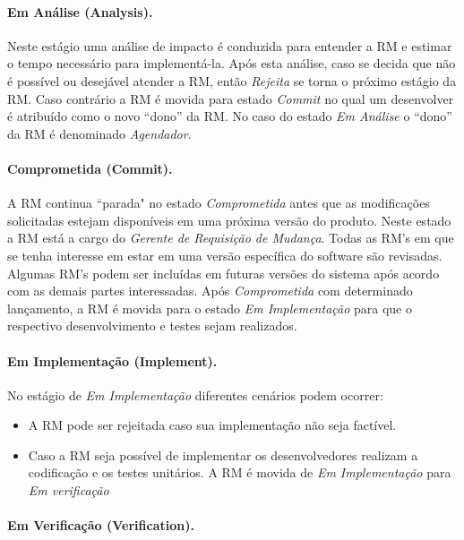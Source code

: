 \paragraph{Em Análise (Analysis).}
\label{par:em_analise}
Neste estágio uma análise de impacto é conduzida para entender a RM e estimar o
tempo necessário para implementá-la. Após esta análise, caso se decida que não é
possível ou desejável atender a RM, então \textit{Rejeita} se torna o próximo
estágio da RM. Caso contrário a RM é movida para estado \textit{Commit} no qual
um desenvolver é atribuído como o  novo ``dono'' da RM. No caso do estado
\textit{Em Análise} o ``dono'' da RM é denominado \textit{Agendador}.

\paragraph{Comprometida (Commit).}
\label{par:commit}

A RM continua ``parada" no estado \textit{Comprometida} antes que as
modificações solicitadas estejam disponíveis em uma próxima versão do produto.
Neste estado a RM está a cargo do \textit{Gerente de Requisição de Mudança}.
Todas as RM's em que se tenha interesse em estar em uma versão específica do
software são revisadas. Algumas RM's podem ser incluídas em futuras versões do
sistema após acordo com as demais partes interessadas. Após
\textit{Comprometida} com determinado lançamento, a RM é movida para o estado
\textit{Em Implementação} para que o respectivo desenvolvimento e testes sejam
realizados.

\paragraph{Em Implementação (Implement).}
\label{par:em_implementacao}

No estágio de \textit{Em Implementação} diferentes cenários podem ocorrer:

\begin{itemize}
	\item A RM pode ser rejeitada caso sua implementação não seja factível.
	\item Caso a RM seja possível de implementar os desenvolvedores realizam a
		codificação e os testes unitários. A RM é movida de \textit{Em
			Implementação} para \textit{Em verificação}
\end{itemize}

\paragraph{Em Verificação (Verification).}
\label{par:em_verificacao}

